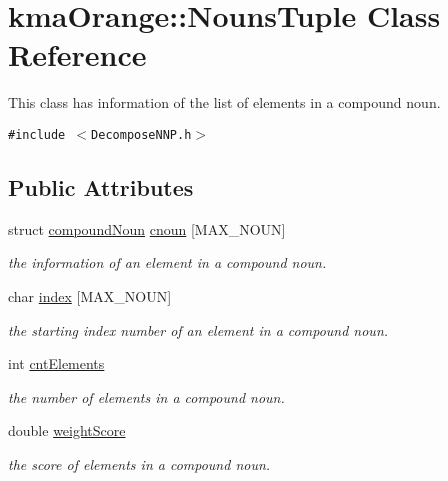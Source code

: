 \hypertarget{classkmaOrange_1_1NounsTuple}{
\section{kmaOrange::NounsTuple Class Reference}
\label{classkmaOrange_1_1NounsTuple}
}
This class has information of the list of elements in a compound noun.  


{\tt \#include $<$DecomposeNNP.h$>$}

\subsection*{Public Attributes}
\begin{CompactItemize}
\item 
struct \hyperlink{structkmaOrange_1_1compoundNoun}{compoundNoun} \hyperlink{classkmaOrange_1_1NounsTuple_dbf8742a114ba2bd71b2160b484e36d1}{cnoun} \mbox{[}MAX\_\-NOUN\mbox{]}
\begin{CompactList}\small\item\em the information of an element in a compound noun. \item\end{CompactList}\item 
char \hyperlink{classkmaOrange_1_1NounsTuple_edb080ce36e388b3bf17f633efba884b}{index} \mbox{[}MAX\_\-NOUN\mbox{]}
\begin{CompactList}\small\item\em the starting index number of an element in a compound noun. \item\end{CompactList}\item 
int \hyperlink{classkmaOrange_1_1NounsTuple_0e542c73cf0f11dd256a9b9079c6682e}{cntElements}
\begin{CompactList}\small\item\em the number of elements in a compound noun. \item\end{CompactList}\item 
double \hyperlink{classkmaOrange_1_1NounsTuple_5a1fe5e0bf3d38a3ad61d0894c03f4f3}{weightScore}
\begin{CompactList}\small\item\em the score of elements in a compound noun. \item\end{CompactList}\end{CompactItemize}


